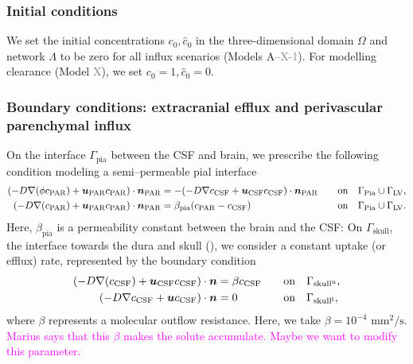 \documentclass[fleqn,10pt]{wlscirep}
\newcommand{\rami}[1]{\textcolor{blue}{#1}}
\newcommand{\mer}[1]{\textcolor{magenta}{#1}}
\newcommand{\draft}[1]{\textcolor{gray}{#1}}
\newcommand{\pia}{\Gamma_{\rm{Pia}}}
\begin{document}
\subsubsection*{Initial conditions}

We set the initial concentrations $c_0, \hat{c}_0$ in the three-dimensional domain $\Omega$ and network $\Lambda$ to be zero for all influx scenarios (Models A--\draft{X-1}). For modelling clearance (Model \draft{X}), we set $c_0 = 1, \hat{c}_0 = 0$.

\subsubsection*{Boundary conditions: extracranial efflux and perivascular parenchymal influx}
On the interface $\Gamma_{\mathrm{pia}}$ between the CSF and brain, we prescribe the following condition modeling a semi--permeable pial interface 
\begin{alignat}{2}
(-D \nabla (\phi c_{\rm{PAR}}) + \bm u_{\rm{PAR}} c_{\rm{PAR} }) \cdot \bm{n}_{\rm{PAR}} &= - (- D \nabla c_{\rm{CSF}} + \bm u_{\rm{CSF}} c_{\rm{CSF}} ) \cdot \bm{n}_{\rm{PAR}} &&  \quad  \mathrm{on} \quad \pia \cup \Gamma_{\mathrm{LV}} ,  \\  
(-D \nabla ( c_{\rm{PAR}}) + \bm u_{\rm{PAR}} c_{\rm{PAR} }) \cdot \bm{n}_{\rm{PAR}} & = \beta_{\rm{pia}} (c_{\rm PAR} - c_{\mathrm{CSF}}) &&  \quad  \mathrm{on} \quad  \pia \cup \Gamma_{\mathrm{LV}} .  
\end{alignat} 
Here, $\beta_{\mathrm{pia}}$ is a permeability constant between the brain and the CSF: On $\Gamma_{\mathrm{skull}}$, the interface towards the dura and skull (), we consider a constant uptake (or efflux) rate, represented by the boundary condition 
\begin{alignat}{2}
(- D \nabla ( c_{\mathrm{CSF}}) + \bm u_{\mathrm{CSF}} c_{\mathrm{CSF}}) \cdot \bm{n}   & = \beta c_{\mathrm{CSF}}  && \quad \mathrm{on} \quad \Gamma_{\mathrm{skull}^{\rm u}},\\ 
(-D \nabla c_{\rm CSF} + \bm u c_{\rm CSF}) \cdot \bm{n} & =  0   &&  \quad  \mathrm{on} \quad \Gamma_{\rm skull^{l}} , 
\end{alignat}
where $\beta$ represents a molecular outflow resistance. Here, we take $\beta = 10^{-4} \,\, \mathrm{mm}^2/\mathrm{s}$\cite{hornkjol2022csf}.
\mer{Marius says that this $\beta$ makes the solute accumulate. Maybe we want to modify this parameter.}
\end{document}
